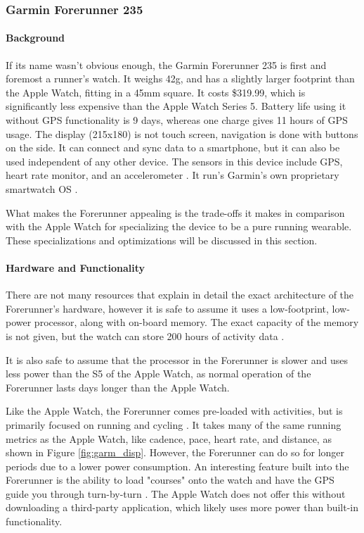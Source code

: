 \subsubsection{Garmin Forerunner 235}
\paragraph{Background}
If its name wasn't obvious enough, the Garmin Forerunner 235 is first and foremost a runner's
watch. It weighs 42g, and has a slightly larger footprint than the Apple Watch, fitting in a 45mm square.
It costs \$319.99, which is significantly less expensive than the Apple Watch Series 5. Battery life using
it without GPS functionality is 9 days, whereas one charge gives 11 hours of GPS usage. The display (215x180)
is not touch screen, navigation is done with buttons on the side. It can connect and 
sync data to a smartphone, but it can also be used independent of any other device. The sensors 
in this device include GPS, heart rate monitor, and an accelerometer \cite{garmin_price}. 
It run's Garmin's own proprietary smartwatch OS \cite{garmin_specs}.

What makes the Forerunner appealing is the trade-offs it makes in comparison with the Apple Watch
for specializing the device to be a pure running wearable. These specializations and optimizations will
be discussed in this section.

\paragraph{Hardware and Functionality}
There are not many resources that explain in detail the exact architecture of the Forerunner's hardware,
however it is safe to assume it uses a low-footprint, low-power processor, along with on-board memory.
The exact capacity of the memory is not given, but the watch can store 200 hours of activity data \cite{garmin_price}.

It is also safe to assume that the processor in the Forerunner is slower and uses less power than the S5
of the Apple Watch, as normal operation of the Forerunner lasts days longer than the Apple Watch.

Like the Apple Watch, the Forerunner comes pre-loaded with activities, but is primarily focused on
running and cycling \cite{garmin_price}. It takes many of the same running metrics as the Apple Watch,
like cadence, pace, heart rate, and distance, as shown in Figure \ref{fig:garm_disp}. 
However, the Forerunner can do so for longer periods due to a lower power consumption.
An interesting feature built into the Forerunner is the ability to load "courses" onto the watch and have
the GPS guide you through turn-by-turn \cite{garmin_course}. The Apple Watch does not offer this without downloading a third-party
application, which likely uses more power than built-in functionality.

